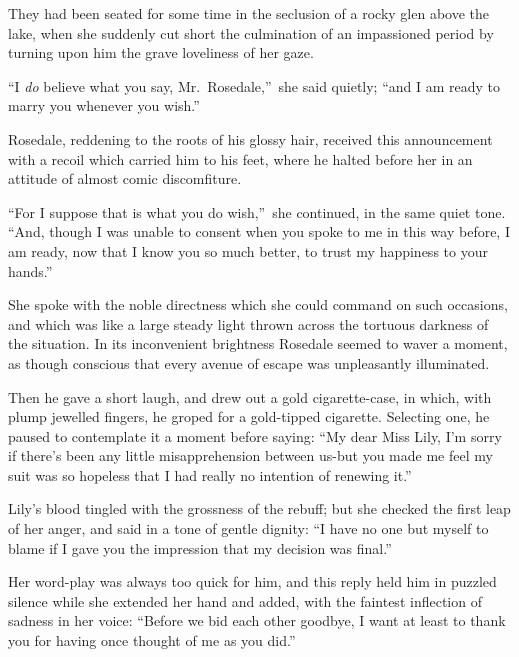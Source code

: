 \documentclass[12pt,a4paper]{book}
\begin{document}
They had been seated for some time in the seclusion of a rocky
glen above the lake, when she suddenly cut short the culmination
of an impassioned period by turning upon him the grave loveliness
of her gaze.





``I \textit{do} believe what you say, Mr.\ Rosedale,''\ she said quietly; ``and
I am ready to marry you whenever you wish.''





Rosedale, reddening to the roots of his glossy hair, received
this announcement with a recoil which carried him to his feet,
where he halted before her in an attitude of almost comic
discomfiture.





``For I suppose that is what you do wish,''\ she continued, in the
same quiet tone. ``And, though I was unable to consent when you
spoke to me in this way before, I am ready, now that I know you
so much better, to trust my happiness to your hands.''





She spoke with the noble directness which she could command on
such occasions, and which was like a large steady light thrown
across the tortuous darkness of the situation. In its
inconvenient brightness Rosedale seemed to waver a moment, as
though conscious that every avenue of escape was unpleasantly
illuminated.





Then he gave a short laugh, and drew out a gold cigarette-case,
in which, with plump jewelled fingers, he groped for a
gold-tipped cigarette. Selecting one, he paused to contemplate it
a moment before saying: ``My dear Miss Lily, I'm sorry if there's
been any little misapprehension between us-but you made me feel
my suit was so hopeless that I had really no intention of
renewing it.''





Lily's blood tingled with the grossness of the rebuff; but she checked
the first leap of her anger, and said in a tone of gentle dignity: 
``I have no one but myself to blame if I gave you the impression
that my decision was final.''





Her word-play was always too quick for him, and this reply held
him in puzzled silence while she extended her hand and added,
with the faintest inflection of sadness in her voice: ``Before we
bid each other goodbye, I want at least to thank you for having
once thought of me as you did.''
\end{document}
